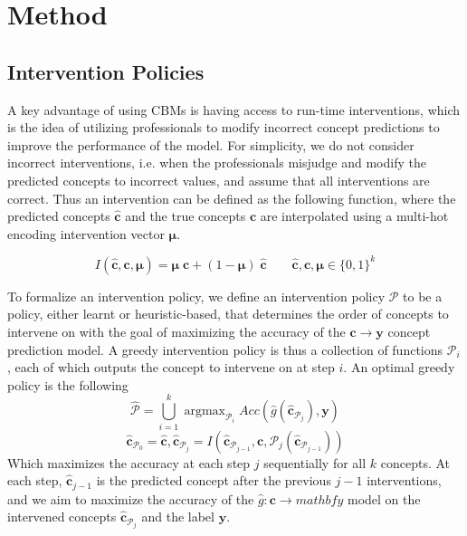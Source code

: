 \documentclass[../main.tex]{subfiles}
\begin{document}
\chapter{Method}


\section{Intervention Policies}

A key advantage of using CBMs is having access to 
run-time interventions, which is the idea of utilizing professionals
to modify incorrect concept predictions to improve the 
performance of the model.
For simplicity, we do not consider incorrect interventions, 
i.e. when the professionals misjudge and modify
 the predicted concepts to incorrect values,
and assume that
all interventions are correct. Thus an intervention
can be defined as the following function, where
the predicted concepts $\hat{\mathbf{c}}$ and the true concepts $\mathbf{c}$ are interpolated
using a multi-hot encoding intervention vector $\bm{\mu}$.

\[I(\hat{\mathbf{c}}, \mathbf{c}, \bm{\mu}) = 
\bm{\mu} \; \mathbf{c} + (1 - \bm{\mu}) \; \hat{\mathbf{c}} \qquad \hat{\mathbf{c}}, \mathbf{c}, \bm{\mu} \in \{0, 1\}^k\]

To formalize an intervention policy, we define an intervention policy $\mathcal{P}$ 
to be a policy, either learnt
or heuristic-based, that determines the order of concepts to intervene 
on with the goal of maximizing the accuracy of the $\mathbf{c} \to \mathbf{y}$ concept prediction model.
A greedy intervention policy is thus a collection of functions $\mathcal{P}_i$, each
of which outputs the concept to intervene on at step $i$. An optimal greedy policy is the following
\[\hat{\mathcal{P}} = \bigcup_{i=1}^k \mathop{\mathrm{argmax}}_{\mathcal{P}_i} Acc(\hat{g}(\hat{\mathbf{c}}_{\mathcal{P}_j}), \mathbf{y}) \]
\[\hat{\mathbf{c}}_{\mathcal{P}_0} = \hat{\mathbf{c}}, \hat{\mathbf{c}}_{\mathcal{P}_j} = I(\hat{\mathbf{c}}_{\mathcal{P}_{j-1}}, \mathbf{c}, \mathcal{P}_j(\hat{\mathbf{c}}_{\mathcal{P}_{j-1}}))\]
Which maximizes the accuracy at each step $j$ sequentially
for all $k$ concepts. At each
step, $\hat{\mathbf{c}}_{j-1}$ is 
the predicted concept after the previous $j-1$ interventions,
and we aim to maximize the accuracy of the $\hat{g}: \mathbf{c} \to mathbf{y}$ model
on the intervened concepts $\hat{\mathbf{c}}_{\mathcal{P}_j}$ and the label $\mathbf{y}$.
\end{document}
